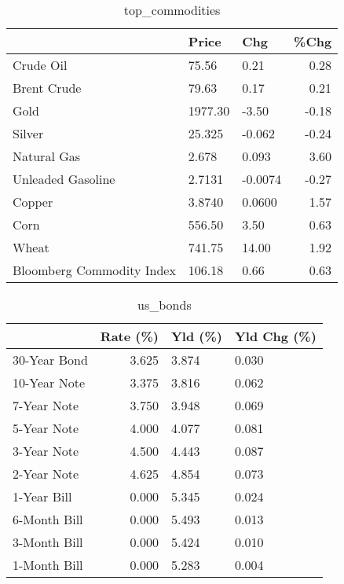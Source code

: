 \documentclass{article}%
\begin{document}
\begin{table}[htbp]%
\caption{top\_commodities}%
\centering%
\begin{adjustbox}{width=1\textwidth}%
\begin{tabular}{lllr}
\toprule
                          &   Price &     Chg &  \%Chg \\
\midrule
               Crude Oil  &   75.56 &    0.21 &  0.28 \\
             Brent Crude  &   79.63 &    0.17 &  0.21 \\
                    Gold  & 1977.30 &   -3.50 & -0.18 \\
                  Silver  &  25.325 &  -0.062 & -0.24 \\
             Natural Gas  &   2.678 &   0.093 &  3.60 \\
       Unleaded Gasoline  &  2.7131 & -0.0074 & -0.27 \\
                  Copper  &  3.8740 &  0.0600 &  1.57 \\
                    Corn  &  556.50 &    3.50 &  0.63 \\
                   Wheat  &  741.75 &   14.00 &  1.92 \\
Bloomberg Commodity Index &  106.18 &    0.66 &  0.63 \\
\bottomrule
\end{tabular}
%
\end{adjustbox}%
\end{table}

%


\begin{table}[htbp]%
\caption{us\_bonds}%
\centering%
\begin{adjustbox}{width=1\textwidth}%
\begin{tabular}{lrll}
\toprule
             &  Rate (\%) & Yld (\%) & Yld Chg (\%) \\
\midrule
30-Year Bond &     3.625 &   3.874 &       0.030 \\
10-Year Note &     3.375 &   3.816 &       0.062 \\
 7-Year Note &     3.750 &   3.948 &       0.069 \\
 5-Year Note &     4.000 &   4.077 &       0.081 \\
 3-Year Note &     4.500 &   4.443 &       0.087 \\
 2-Year Note &     4.625 &   4.854 &       0.073 \\
 1-Year Bill &     0.000 &   5.345 &       0.024 \\
6-Month Bill &     0.000 &   5.493 &       0.013 \\
3-Month Bill &     0.000 &   5.424 &       0.010 \\
1-Month Bill &     0.000 &   5.283 &       0.004 \\
\bottomrule
\end{tabular}
%
\end{adjustbox}%
\end{table}
\end{document}
